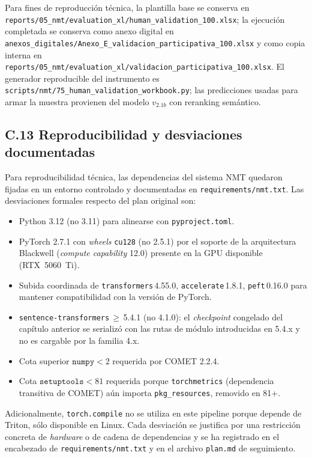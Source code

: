 \documentclass[12pt,a4paper,oneside]{book}
\newcommand{\filepath}[1]{\nolinkurl{#1}}
\begin{document}
Para fines de reproducción técnica, la plantilla base se conserva en \filepath{reports/05\_nmt/evaluation\_xl/human\_validation\_100.xlsx}; la ejecución completada se conserva como anexo digital en \filepath{anexos\_digitales/Anexo\_E\_validacion\_participativa\_100.xlsx} y como copia interna en \filepath{reports/05\_nmt/evaluation\_xl/validacion\_participativa\_100.xlsx}. El generador reproducible del instrumento es \filepath{scripts/nmt/75\_human\_validation\_workbook.py}; las predicciones usadas para armar la muestra provienen del modelo \(v_{2.1b}\) con reranking semántico.

\subsection*{C.13 Reproducibilidad y desviaciones documentadas}\label{anexo-nmt-deviations}

Para reproducibilidad técnica, las dependencias del sistema NMT quedaron fijadas en un entorno controlado y documentadas en \filepath{requirements/nmt.txt}. Las desviaciones formales respecto del plan original son:

\begin{itemize}
  \item Python 3.12 (no 3.11) para alinearse con \texttt{pyproject.toml}.
  \item PyTorch 2.7.1 con \emph{wheels} \texttt{cu128} (no 2.5.1) por el soporte de la arquitectura Blackwell (\emph{compute capability} 12.0) presente en la GPU disponible (RTX~5060~Ti).
  \item Subida coordinada de \texttt{transformers}\,4.55.0, \texttt{accelerate}\,1.8.1, \texttt{peft}\,0.16.0 para mantener compatibilidad con la versión de PyTorch.
  \item \texttt{sentence-transformers}\,$\geq$\,5.4.1 (no 4.1.0): el \emph{checkpoint} congelado del capítulo anterior se serializó con las rutas de módulo introducidas en 5.4.x y no es cargable por la familia 4.x.
  \item Cota superior \(\texttt{numpy}<2\) requerida por COMET 2.2.4.
  \item Cota \(\texttt{setuptools}<81\) requerida porque \texttt{torchmetrics} (dependencia transitiva de COMET) aún importa \texttt{pkg\_resources}, removido en 81+.
\end{itemize}

Adicionalmente, \texttt{torch.compile} no se utiliza en este pipeline porque depende de Triton, sólo disponible en Linux. Cada desviación se justifica por una restricción concreta de \emph{hardware} o de cadena de dependencias y se ha registrado en el encabezado de \texttt{requirements/nmt.txt} y en el archivo \texttt{plan.md} de seguimiento.
\end{document}
